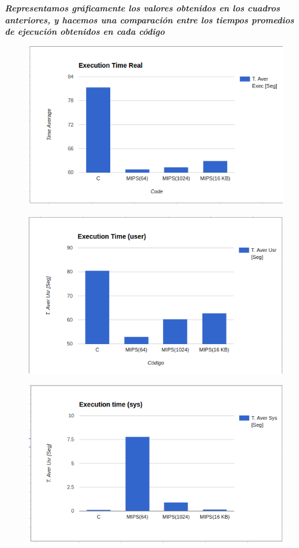 \documentclass{article}
\begin{document}
\clearpage

\begin{center}
\textit{\textbf{Representamos gráficamente los valores obtenidos en los cuadros anteriores, y hacemos una comparación entre los tiempos promedios de ejecución obtenidos en cada código}}
\end{center}

\begin{figure}[H]
	\centering
		\includegraphics[scale=0.6]{TPromExecReal.png}
\end{figure}
\begin{figure}[H]
	\centering
	\includegraphics[scale=0.6]{TPromExecUsr.png}
\end{figure}
\begin{figure}[H]
	\centering
		\includegraphics[scale=0.6]{TPromExecSys.png}
\end{figure}
\end{document}
